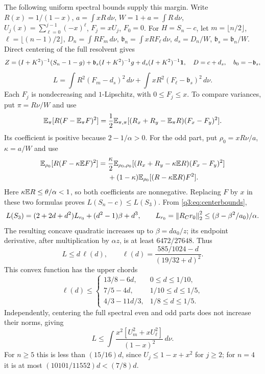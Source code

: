 The following uniform spectral bounds supply this margin. Write
$R(x)=1/(1-x)$, $a=\int xR\,d\nu$, $W=1+a=\int R\,d\nu$,
$U_j(x)=\sum_{\ell=0}^{j-1}(-x)^\ell$, $F_j=xU_j$, $F_0=0$.
For $H=S_n-c$, let $m=\lfloor n/2\rfloor$, $\ell=\lfloor(n-1)/2\rfloor$,
$D_n=\int RF_m\,d\nu$, $\mathfrak b_n=\int xRF_\ell\,d\nu$,
$d_s=D_n/W$, $\mathfrak b_s=\mathfrak b_n/W$. Direct centering of the full resolvent gives
\[
 Z=(I+K^2)^{-1}(S_n-1-g)+\mathfrak b_s(I+K^2)^{-1}g+
 d_s(I+K^2)^{-1}\mathbf1,\quad D=c+d_s,\quad b_0=-\mathfrak b_s,
\]
\[
 L=\int R^2(F_m-d_s)^2\,d\nu+
       \int xR^2(F_\ell-\mathfrak b_s)^2\,d\nu.
\]
Each $F_j$ is nondecreasing and $1$-Lipschitz, with $0\le F_j\le x$. To compare variances, put $\pi=R\nu/W$ and use
\[
 \mathbb E_\pi[R(F-\mathbb E_\pi F)^2]
 =\frac12\mathbb E_{\pi,\pi}[(R_x+R_y-\mathbb E_\pi R)(F_x-F_y)^2].
\]
Its coefficient is positive because $2-1/\alpha>0$. For the odd part, put
$\rho_0=xR\nu/a$, $\kappa=a/W$ and use
\[
\begin{split}
 \mathbb E_{\rho_0}[R(F-\kappa\mathbb E F)^2]
 ={}&\frac\kappa2\mathbb E_{\rho_0,\rho_0}
 [(R_x+R_y-\kappa\mathbb E R)(F_x-F_y)^2]\\
 &+(1-\kappa)\mathbb E_{\rho_0}[(R-\kappa\mathbb E R)F^2].
\end{split}
\]
Here $\kappa\mathbb E R\le\theta/\alpha<1$, so both coefficients are nonnegative. Replacing $F$ by $x$ in these two formulas proves $L(S_n-c)\le L(S_3)$.
From \eqref{q3:eq:centerbounds},
\[
 L(S_3)=(2+2d+d^2)L_{r_0}+(d^2-1)\beta+d^3,\qquad
 L_{r_0}=\left\lVert R_C{r_0}\right\rVert_2^2\le(\beta-\beta^2/a_0)/\alpha .
\]
The resulting concave quadratic increases up to $\beta=da_0/z$; its endpoint derivative, after multiplication by $\alpha z$, is at least $6472/27648$. Thus
\[
 L\le d\,\ell(d),\qquad
 \ell(d)=\frac{585/1024-d}{(19/32+d)^2}.
\]
This convex function has the upper chords
\[
 \ell(d)\le
 \begin{cases}
 13/8-6d,&0\le d\le1/10,\\
 7/5-4d,&1/10\le d\le1/5,\\
 4/3-11d/3,&1/8\le d\le1/5.
 \end{cases}
\]
Independently, centering the full spectral even and odd parts does not increase their norms, giving
\[
 L\le\int\frac{x^2[U_m^2+xU_\ell^2]}{(1-x)^2}\,d\nu.
\]
For $n\ge5$ this is less than $(15/16)d$, since $U_j\le1-x+x^2$ for $j\ge2$; for $n=4$ it is at most $(10101/11552)d<(7/8)d$.

